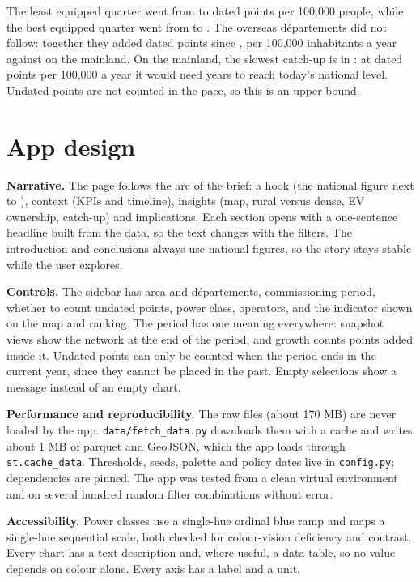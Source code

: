 \documentclass[11pt]{article}
\begin{document}
The least equipped quarter went from \nConvLowBefore{} to \nConvLowAfter{} dated points per 100,000 people, while the best equipped quarter went from \nConvHighBefore{} to \nConvHighAfter. The overseas départements did not follow: together they added \nOverAdded{} dated points since \nStartYear, \nOverPace{} per 100,000 inhabitants a year against \nMainPace{} on the mainland. On the mainland, the slowest catch-up is in \nSlowestName: at \nSlowestPace{} dated points per 100,000 a year it would need \nSlowestYears{} years to reach today's national level. Undated points are not counted in the pace, so this is an upper bound.

\section{App design}

\textbf{Narrative.} The page follows the arc of the brief: a hook (the national figure next to \nLowestName), context (KPIs and timeline), insights (map, rural versus dense, EV ownership, catch-up) and implications. Each section opens with a one-sentence headline built from the data, so the text changes with the filters. The introduction and conclusions always use national figures, so the story stays stable while the user explores.

\textbf{Controls.} The sidebar has area and départements, commissioning period, whether to count undated points, power class, operators, and the indicator shown on the map and ranking. The period has one meaning everywhere: snapshot views show the network at the end of the period, and growth counts points added inside it. Undated points can only be counted when the period ends in the current year, since they cannot be placed in the past. Empty selections show a message instead of an empty chart.

\textbf{Performance and reproducibility.} The raw files (about 170 MB) are never loaded by the app. \texttt{data/fetch\_data.py} downloads them with a cache and writes about 1 MB of parquet and GeoJSON, which the app loads through \texttt{st.cache\_data}. Thresholds, seeds, palette and policy dates live in \texttt{config.py}; dependencies are pinned. The app was tested from a clean virtual environment and on several hundred random filter combinations without error.

\textbf{Accessibility.} Power classes use a single-hue ordinal blue ramp and maps a single-hue sequential scale, both checked for colour-vision deficiency and contrast. Every chart has a text description and, where useful, a data table, so no value depends on colour alone. Every axis has a label and a unit.
\end{document}
